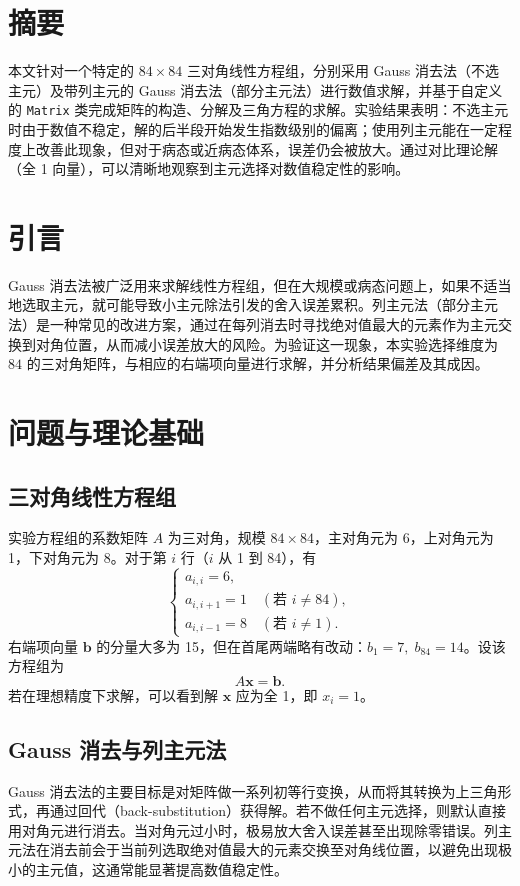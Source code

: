 \documentclass[UTF8]{ctexart}
\begin{document}
\pagestyle{fancy}
\fancyhead{}

\section{摘要}
本文针对一个特定的 $84\times 84$ 三对角线性方程组，分别采用 Gauss 消去法（不选主元）及带列主元的 Gauss 消去法（部分主元法）进行数值求解，并基于自定义的 \texttt{Matrix} 类完成矩阵的构造、分解及三角方程的求解。实验结果表明：不选主元时由于数值不稳定，解的后半段开始发生指数级别的偏离；使用列主元能在一定程度上改善此现象，但对于病态或近病态体系，误差仍会被放大。通过对比理论解（全 1 向量），可以清晰地观察到主元选择对数值稳定性的影响。

\section{引言}
Gauss 消去法被广泛用来求解线性方程组，但在大规模或病态问题上，如果不适当地选取主元，就可能导致小主元除法引发的舍入误差累积。列主元法（部分主元法）是一种常见的改进方案，通过在每列消去时寻找绝对值最大的元素作为主元交换到对角位置，从而减小误差放大的风险。为验证这一现象，本实验选择维度为 $84$ 的三对角矩阵，与相应的右端项向量进行求解，并分析结果偏差及其成因。

\section{问题与理论基础}

\subsection{三对角线性方程组}
实验方程组的系数矩阵 $A$ 为三对角，规模 $84\times 84$，主对角元为 6，上对角元为 1，下对角元为 8。对于第 $i$ 行（$i$ 从 1 到 84），有
\[
\begin{cases}
a_{i,i} = 6,\\
a_{i,i+1} = 1 \quad (\text{若 } i \neq 84),\\
a_{i,i-1} = 8 \quad (\text{若 } i \neq 1).
\end{cases}
\]
右端项向量 $\mathbf{b}$ 的分量大多为 15，但在首尾两端略有改动：$b_1 = 7, \; b_{84} = 14$。设该方程组为
\[
A \mathbf{x} = \mathbf{b}.
\]
若在理想精度下求解，可以看到解 $\mathbf{x}$ 应为全 1，即 $x_i = 1$。

\subsection{Gauss 消去与列主元法}
Gauss 消去法的主要目标是对矩阵做一系列初等行变换，从而将其转换为上三角形式，再通过回代（back-substitution）获得解。若不做任何主元选择，则默认直接用对角元进行消去。当对角元过小时，极易放大舍入误差甚至出现除零错误。列主元法在消去前会于当前列选取绝对值最大的元素交换至对角线位置，以避免出现极小的主元值，这通常能显著提高数值稳定性。
\end{document}
